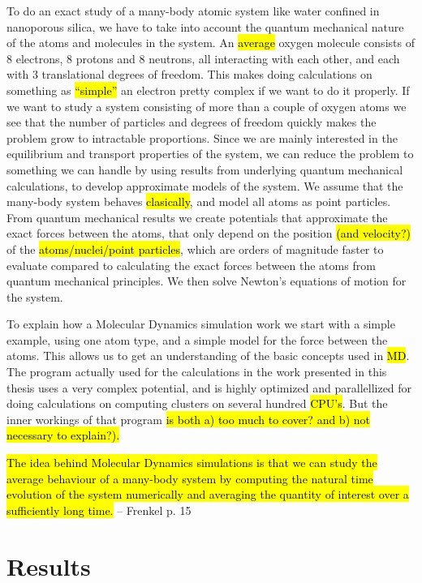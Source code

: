 \documentclass[twoside,english,a4paper]{uiofysmaster}
\begin{document}
To do an exact study of a many-body atomic system like water confined in nanoporous silica, we have to take into account the quantum mechanical nature of the atoms and molecules in the system. An \hl{average} oxygen molecule consists of 8 electrons, 8 protons and 8 neutrons, all interacting with each other, and each with 3 translational degrees of freedom. This makes doing calculations on something as \hl{``simple''} an electron pretty complex if we want to do it properly. If we want to study a system consisting of more than a couple of oxygen atoms we see that the number of particles and degrees of freedom quickly makes the problem grow to intractable proportions. Since we are mainly interested in the equilibrium and transport properties of the system, we can reduce the problem to something we can handle by using results from underlying quantum mechanical calculations, to develop approximate models of the system. We assume that the many-body system behaves \hl{clasically}, and model all atoms as point particles. From quantum mechanical results we create potentials that approximate the exact forces between the atoms, that only depend on the position \hl{(and velocity?)} of the \hl{atoms/nuclei/point particles}, which are orders of magnitude faster to evaluate compared to calculating the exact forces between the atoms from quantum mechanical principles. We then solve Newton's equations of motion for the system.

To explain how a Molecular Dynamics simulation work we start with a simple example, using one atom type, and a simple model for the force between the atoms. This allows us to get an understanding of the basic concepts used in \hl{MD}. The program actually used for the calculations in the work presented in this thesis uses a very complex potential, and is highly optimized and parallellized for doing calculations on computing clusters on several hundred \hl{CPU's}. But the inner workings of that program \hl{is both a) too much to cover? and b) not necessary to explain?).}

\hl{The idea behind Molecular Dynamics simulations is that we can study the average behaviour of a many-body system by computing the natural time evolution of the system numerically and averaging the quantity of interest over a sufficiently long time.} -- Frenkel p. 15

    



\part{Results}
\end{document}
